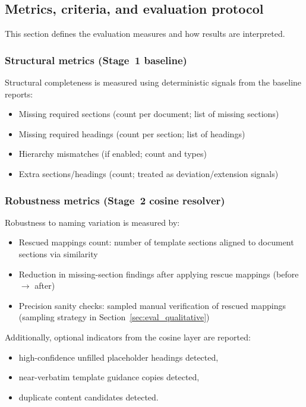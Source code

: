\subsection{Metrics, criteria, and evaluation protocol}
\label{sec:eval_metrics}

This section defines the evaluation measures and how results are interpreted.

\subsubsection{Structural metrics (Stage~1 baseline)}
\label{sec:eval_structural_metrics}

Structural completeness is measured using deterministic signals from the baseline reports:
\begin{itemize}
    \item Missing required sections (count per document; list of missing sections)
    \item Missing required headings (count per section; list of headings)
    \item Hierarchy mismatches (if enabled; count and types)
    \item Extra sections/headings (count; treated as deviation/extension signals)
\end{itemize}

\subsubsection{Robustness metrics (Stage~2 cosine resolver)}
\label{sec:eval_robustness_metrics}

Robustness to naming variation is measured by:
\begin{itemize}
    \item Rescued mappings count: number of template sections aligned to document sections via similarity
    \item Reduction in missing-section findings after applying rescue mappings (before $\rightarrow$ after)
    \item Precision sanity checks: sampled manual verification of rescued mappings (sampling strategy in Section~\ref{sec:eval_qualitative})
\end{itemize}

Additionally, optional indicators from the cosine layer are reported:
\begin{itemize}
    \item high-confidence unfilled placeholder headings detected,
    \item near-verbatim template guidance copies detected,
    \item duplicate content candidates detected.
\end{itemize}

